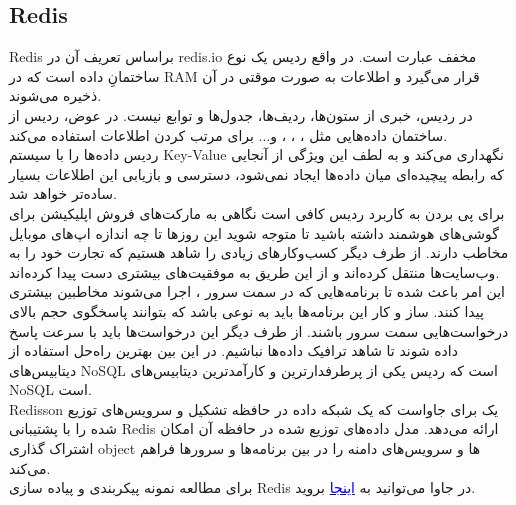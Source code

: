 \documentclass[]{article}
\newcommand{\link}[2]{\href{#1}{\textcolor{blue}{#2}}}
\begin{document}
\subsection*{{\titr Redis}}
Redis براساس تعریف آن در redis.io مخفف عبارت  است. در واقع ردیس یک نوع ساختمانِ داده است که در RAM قرار می‌گیرد و اطلاعات به صورت موقتی در آن ذخیره می‌شوند.\\
در ردیس، خبری از ستون‌ها، ردیف‌ها، جدول‌ها و توابع نیست. در عوض، ردیس از ساختمان داده‌هایی مثل ، ، ،  و... برای مرتب کردن اطلاعات استفاده می‌کند.\\
ردیس داده‌ها را با سیستم Key-Value نگهداری می‌کند و به لطف این ویژگی از آنجایی که رابطه پیچیده‌ای میان داده‌ها ایجاد نمی‌شود، دسترسی و بازیابی این اطلاعات بسیار ساده‌تر خواهد شد.\\
برای پی بردن به کاربرد ردیس کافی است نگاهی به مارکت‌های فروش اپلیکیشن برای گوشی‌های هوشمند داشته باشید تا متوجه شوید این روزها تا چه اندازه اپ‌های موبایل مخاطب دارند. از طرف دیگر کسب‌و‌کارهای زیادی را شاهد هستیم که تجارت خود را به وب‌سایت‌ها منتقل کرده‌اند و از این طریق به موفقیت‌های بیشتری دست ‌پیدا کرده‌‌اند.\\
این امر باعث شده تا برنامه‌هایی که در سمت سرور ، اجرا می‌شوند مخاطبین بیشتری پیدا کنند. ساز و کار این برنامه‌ها باید به نوعی باشد که بتوانند پاسخگوی حجم بالای درخواست‌هایی سمت سرور باشند. از طرف دیگر این درخواست‌ها باید با سرعت پاسخ داده شوند تا شاهد ترافیک داده‌ها نباشیم. در این بین بهترین راه‌حل استفاده از دیتابیس‌های NoSQL است که ردیس یکی از پرطرفدارترین و کارآمدترین دیتابیس‌های NoSQL است.\\
Redisson یک  برای جاواست که یک شبکه داده در حافظه تشکیل و سرویس‌های توزیع شده را با پشتیبانی Redis ارائه می‌دهد. مدل داده‌های توزیع شده در حافظه آن امکان اشتراک گذاری object ها و سرویس‌های دامنه را در بین برنامه‌ها و سرورها فراهم می‌کند.\\
برای مطالعه نمونه پیکربندی و پیاده سازی Redis در جاوا می‌توانید به \link{https://www.baeldung.com/redis-redisson}{اینجا} بروید.
\end{document}
